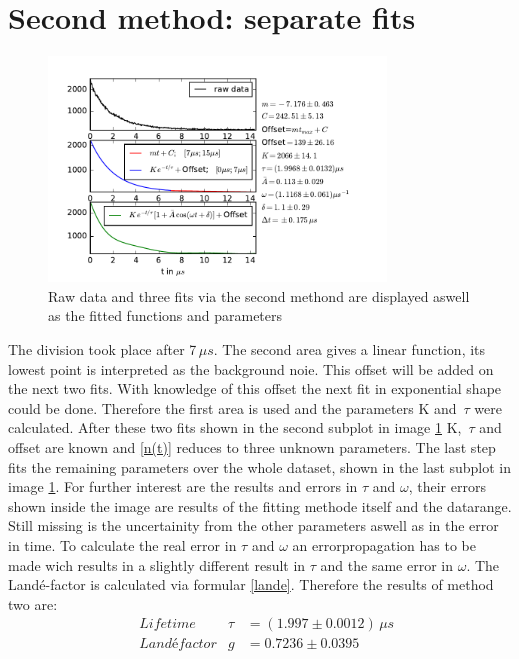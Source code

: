 \documentclass{include/thesisclass3}
\newcommand{\e}[1]{\,\si{#1}}
\begin{document}
\section{Second method: separate fits}
\label{second}
\begin{figure}[H]
	\begin{center}
		\includegraphics[width=0.8\textwidth]{images/plot.pdf}
		\caption{Raw data and three fits via the second methond are displayed aswell as the fitted functions and parameters}
		\label{method2}
	\end{center}
\end{figure}
The division took place after 7$\e{\mu s}$. The second area gives a linear function, its lowest point is interpreted as the background noie. This offset will be added on the next two fits. With knowledge of this offset the next fit in exponential shape could be done. Therefore the first area is used and the parameters K and $\e{\tau}$ were calculated. After these two fits shown in the second subplot in image \ref{method2} K, $\e{\tau}$ and offset are known and \ref{n(t)} reduces to three unknown parameters. The last step fits the remaining parameters over the whole dataset, shown in the last subplot in image \ref{method2}. For further interest are the results and errors in $\tau$ and $\omega$, their errors shown inside the image are results of the fitting methode itself and the datarange. Still missing is the uncertainity from the other parameters aswell as in the error in time. To calculate the real error in $\tau$ and $\omega$ an errorpropagation has to be made wich results in a slightly different result in $\tau$ and the same error in $\omega$. The Landé-factor is calculated via formular \ref{lande}. Therefore the results of method two are:
\begin{align}
&\e{Lifetime} &\tau &=(1.997\pm 0.0012)\e{\mu s}\\
&\e{Landé factor} &g &=0.7236 \pm 0.0395
\end{align}
\end{document}
